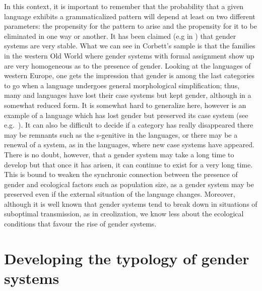 \documentclass[output=collectionpaper]{langsci/langscibook}
\begin{document}
In this context, it is important to remember that the probability that a given language exhibits a grammaticalized pattern will depend at least on two different parameters: the propensity for the pattern to arise and the propensity for it to be eliminated in one way or another. It has been claimed (e.g in \citealt[199]{Dahl2004}) that gender systems are very stable. What we can see in Corbett’s sample is that the families in the western Old World where gender systems with formal assignment show up are very homogeneous as to the presence of gender. Looking at the languages of western Europe, one gets the impression that gender is among the last categories to go when a language undergoes general morphological simplification; thus, many  and  languages have lost their case systems but kept gender, although in a somewhat reduced form. It is somewhat hard to generalize here, however \textendash{}  is an example of a language which has lost gender but preserved its case system (see e.g.\ \citealt{Kulikov2006}). It can also be difficult to decide if a category has really disappeared \textendash{} there may be remnants such as the s-genitive in the  languages, or there may be a renewal of a system, as in the  languages, where new case systems have appeared. There is no doubt, however, that a gender system may take a long time to develop but that once it has arisen, it can continue to exist for a very long time. This is bound to weaken the synchronic connection between the presence of gender and ecological factors such as population size, as a gender system may be preserved even if the external situation of the language changes. Moreover, although it is well known that gender systems tend to break down in situations of suboptimal transmission, as in creolization, we know less about the ecological conditions that favour the rise of gender systems.

\section{Developing the typology of gender systems}
\end{document}
